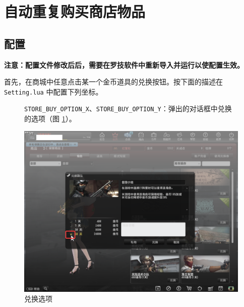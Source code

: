 \section{自动重复购买商店物品}

\subsection{配置}

\textbf{\color{red}注意：配置文件修改后后，需要在罗技软件中重新导入并运行以使配置生效。}

首先，在商城中任意点击某一个金币道具的兑换按钮。按下面的描述在 \lstinline{Setting.lua} 中配置下列坐标。

\begin{figure}[H]
    \Centering
    \parbox[l]{\textwidth}{\lstinline{STORE_BUY_OPTION_X}、\lstinline{STORE_BUY_OPTION_Y}：弹出的对话框中兑换的选项（图 \ref{ch4fig-store-buy-option}）。}
    \includegraphics[width=\textwidth]{docs/assets/store_buy_option.png}
    \caption{兑换选项}
    \label{ch4fig-store-buy-option}
\end{figure}
\clearpage

